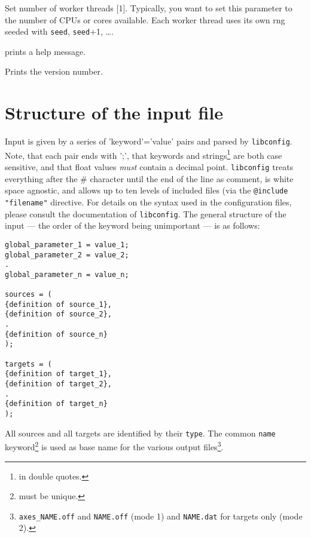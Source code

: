 \documentclass[10pt,a4paper,titlepage]{article}
\begin{document}
\begin{list}{}
\item[{\tt [--threads|-t]}] {Set number of worker threads [1]. Typically, you want to set this parameter to the number of CPUs or cores available. Each worker thread uses its own rng seeded with {\tt seed}, {\tt seed}+1}, \ldots{}.

\item[{\tt [--help|-h]}] prints a help message.

\item[{\tt [--Version|-V]}] Prints the version number.

\end{list}


\section{Structure of the input file}
Input is given by a series of 'keyword'='value' pairs and parsed by {\tt libconfig}. Note, that each pair ends with ';', that keywords and strings\footnote{in double quotes.} are both case sensitive, and that float values \emph{must} contain a decimal point. {\tt libconfig} treats everything after the \# character until the end of the line as comment, is white space agnostic, and allows up to ten levels of included files (via the {\tt @include "filename"} directive. For details on the syntax used in the configuration files, please consult the documentation of {\tt libconfig}.
The general structure of the input --- the order of the keyword being unimportant --- is as follows:

\begin{verbatim}
global_parameter_1 = value_1;
global_parameter_2 = value_2;
.
global_parameter_n = value_n;

sources = (
{definition of source_1},
{definition of source_2},
.
{definition of source_n}
);

targets = (
{definition of target_1}, 
{definition of target_2},
.
{definition of target_n}
);
\end{verbatim}

All sources and all targets are identified by their {\tt type}. The common {\tt name} keyword\footnote{must be unique.} is used as base name for the various output files\footnote{{\tt axes\_NAME.off} and {\tt NAME.off} (mode 1) and {\tt NAME.dat} for targets only (mode 2).}.
\end{document}
